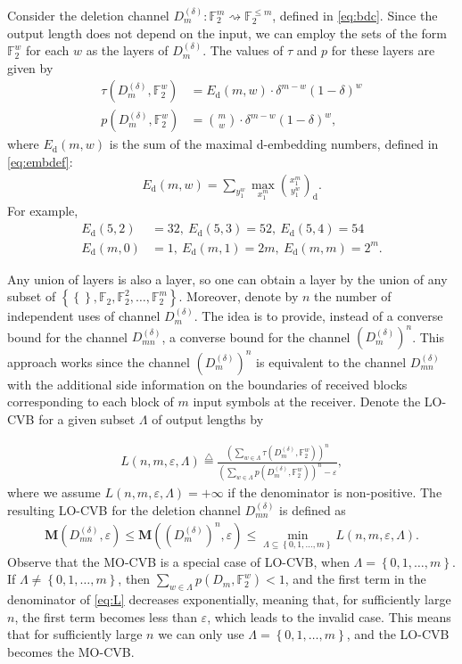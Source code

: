 \documentclass[journal, twocol]{IEEEtran}
\newcommand{\Ed}{{E_{\text{d}}}}
\newcommand{\dlbinom}[2]{{\binom{#1}{#2}_{\!\text{d}}}}
\newcommand{\bF}{{\mathbb{F}}}
\newcommand{\bfM}{{\mathbf{M}}}
\newcommand{\set}[1]{{\left\{{#1}\right\}}}
\newcommand{\br}[1]{{\left({#1}\right)}}
\newcommand{\defeq}{{\overset{\triangle}{=}}}
\newcommand{\ve}{\varepsilon}
\newcommand{\tosq}{\rightsquigarrow}
\begin{document}
Consider the deletion channel $D^{(\delta)}_m:\bF_2^m\tosq \bF_2^{\leq m}$, defined in \eqref{eq:bdc}.
Since the output length does not depend on the input, we can employ the sets of the form $\bF_2^w$ for each $w$ as the layers of $D^{(\delta)}_m$. 
The values of $\tau$ and $p$ for these layers are given by
\begin{align}
\tau(D^{(\delta)}_m, \bF_2^w)&= \Ed(m,w) \cdot \delta^{m-w}(1-\delta)^w
\label{eq:taulD}
\\
p(D^{(\delta)}_m, \bF_2^w)&=\binom{m}{w}\cdot \delta^{m-w}(1-\delta)^w,
\label{eq:pD}
\end{align}
where $\Ed(m,w)$ is the sum of the maximal d-embedding numbers, defined in \eqref{eq:embdef}:
\begin{align}
\Ed(m,w)=\sum_{y_1^w} \max_{x_1^m}\dlbinom{x_1^m}{y_1^w}.
\label{eq:Emw}
\end{align}
For example,
\begin{align}
\Ed(5,2)&=32,\ \Ed(5,3)=52,\ \Ed(5,4)=54
\nonumber \\
\Ed(m,0)&=1,\ \Ed(m,1)=2m,\ \Ed(m,m)=2^m.
\label{eq:Eex}
\end{align}

Any union of layers is also a layer, so one can obtain a layer by the union of any subset of $\set{\set{}, \bF_2,\bF_2^2,\dots, \bF_2^m}$.
Moreover, denote by $n$ the number of independent uses of channel $D_m^{(\delta)}$.
The idea is to provide, instead of a converse bound for the channel $D^{(\delta)}_{mn}$, a converse bound for the channel $(D^{(\delta)}_{m})^n$. This approach works since the channel $(D^{(\delta)}_{m})^n$ is equivalent to the channel $D^{(\delta)}_{mn}$ with the additional side information on the boundaries of received blocks corresponding to each block of $m$ input symbols at the receiver. Denote the LO-CVB for a given subset $\Lambda$ of output lengths by

\begin{gather}
L(n,m,\ve,\Lambda)\defeq
\frac{\br{\displaystyle\sum_{w\in\Lambda}\tau\br{D^{(\delta)}_m,\bF_2^w}}^{\!n}}{\br{\displaystyle\sum_{w\in\Lambda} p\br{D^{(\delta)}_m,\bF_2^w}}^{\!n}-\ve},
\label{eq:L} 
\end{gather}
where we assume $L(n,m,\ve,\Lambda)=+\infty$ if the denominator is non-positive.
The resulting LO-CVB for the deletion channel $D_{mn}^{(\delta)}$ is defined as
\begin{align}
\bfM(D_{mn}^{(\delta)},\ve)\leq \bfM((D_{m}^{(\delta)})^n,\ve)\leq \min_{\Lambda\subseteq\set{0,1,\dots, m}} L(n,m,\ve,\Lambda).
\label{eq:locvbdel}
\end{align}
Observe that the MO-CVB is a special case of LO-CVB, when $\Lambda=\set{0,1,\dots,m}$.
If $\Lambda \neq\set{0,1,\dots,m}$, then $\sum_{w\in\Lambda}p\br{D_m,\bF_2^w}<1$, and the first term in the denominator of \eqref{eq:L} decreases exponentially, meaning that, for sufficiently large $n$, the first term becomes less than $\ve$, which leads to the invalid case.
This means that for sufficiently large $n$ we can only use $\Lambda=\set{0,1,\dots,m}$, and the LO-CVB becomes the MO-CVB. 
\end{document}
